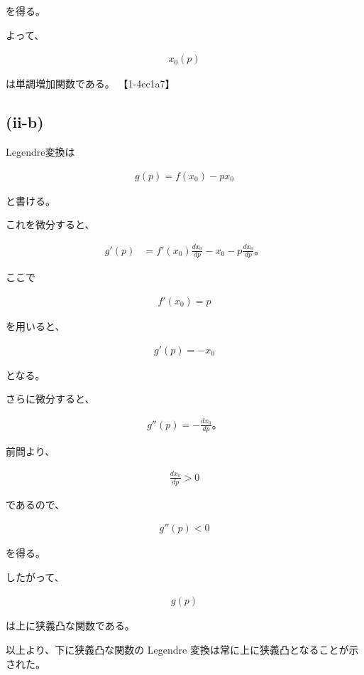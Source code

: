 \documentclass[platex,dvipdfmx,a4paper]{jsarticle}
\begin{document}
を得る。

よって、

\begin{align*}
x_0(p)
\end{align*}

は単調増加関数である。 【1-4ec1a7】

\subsection{(ii-b)}

Legendre変換は

\begin{align*}
g(p)
=
f(x_0)-px_0
\end{align*}

と書ける。

これを微分すると、

\begin{align*}
g'(p)
&=
f'(x_0)\frac{dx_0}{dp}
-x_0
-p\frac{dx_0}{dp}。
\end{align*}

ここで

\begin{align*}
f'(x_0)=p
\end{align*}

を用いると、

\begin{align*}
g'(p)
=
-x_0
\end{align*}

となる。

さらに微分すると、

\begin{align*}
g''(p)
=
-\frac{dx_0}{dp}。
\end{align*}

前問より、

\begin{align*}
\frac{dx_0}{dp}>0
\end{align*}

であるので、

\begin{align*}
g''(p)<0
\end{align*}

を得る。

したがって、

\begin{align*}
g(p)
\end{align*}

は上に狭義凸な関数である。

以上より、下に狭義凸な関数の Legendre 変換は常に上に狭義凸となることが示された。
\end{document}
